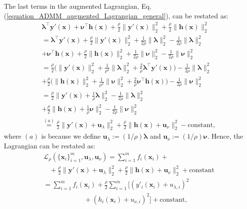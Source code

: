 \documentclass[lang=cn,10pt]{gorgeousnbook}
\numberwithin{equation}{section}%
\numberwithin{figure}{section}%
\begin{document}
The last terms in the augmented Lagrangian, Eq. (\ref{equation_ADMM_augmented_Lagrangian_general}), can be restated as:
\begin{align*}
&\boldsymbol{\lambda}^\top \boldsymbol{y}'(\boldsymbol{x}) + \boldsymbol{\nu}^\top \boldsymbol{h}(\boldsymbol{x}) + \frac{\rho}{2} \|\boldsymbol{y}'(\boldsymbol{x})\|_2^2 + \frac{\rho}{2} \|\boldsymbol{h}(\boldsymbol{x})\|_2^2 \\
&=\boldsymbol{\lambda}^\top \boldsymbol{y}'(\boldsymbol{x}) + \frac{\rho}{2} \|\boldsymbol{y}'(\boldsymbol{x})\|_2^2 + \frac{1}{2\rho} \|\boldsymbol{\lambda}\|_2^2 - \frac{1}{2\rho} \|\boldsymbol{\lambda}\|_2^2 \\
&+ \boldsymbol{\nu}^\top \boldsymbol{h}(\boldsymbol{x}) + \frac{\rho}{2} \|\boldsymbol{h}(\boldsymbol{x})\|_2^2 + \frac{1}{2\rho} \|\boldsymbol{\nu}\|_2^2 - \frac{1}{2\rho} \|\boldsymbol{\nu}\|_2^2 \\
&\!\!= \frac{\rho}{2} \Big(\|\boldsymbol{y}'(\boldsymbol{x})\|_2^2 + \frac{1}{\rho^2} \|\boldsymbol{\lambda}\|_2^2 + \frac{2}{\rho} \boldsymbol{\lambda}^\top \boldsymbol{y}'(\boldsymbol{x}) \Big) - \frac{1}{2\rho} \|\boldsymbol{\lambda}\|_2^2 \\
&+ \frac{\rho}{2} \Big(\|\boldsymbol{h}(\boldsymbol{x})\|_2^2 + \frac{1}{\rho^2} \|\boldsymbol{\nu}\|_2^2 + \frac{2}{\rho} \boldsymbol{\nu}^\top \boldsymbol{h}(\boldsymbol{x}) \Big) - \frac{1}{2\rho} \|\boldsymbol{\nu}\|_2^2 \\
&= \frac{\rho}{2} \big\|\boldsymbol{y}'(\boldsymbol{x}) + \frac{1}{\rho} \boldsymbol{\lambda}\big\|_2^2 - \frac{1}{2\rho} \|\boldsymbol{\lambda}\|_2^2 \\
&+ \frac{\rho}{2} \big\|\boldsymbol{h}(\boldsymbol{x}) + \frac{1}{\rho} \boldsymbol{\nu}\big\|_2^2 - \frac{1}{2\rho} \|\boldsymbol{\nu}\|_2^2 \\
&\overset{(a)}{=} \frac{\rho}{2} \big\|\boldsymbol{y}'(\boldsymbol{x}) + \boldsymbol{u}_\lambda\big\|_2^2 + \frac{\rho}{2} \big\|\boldsymbol{h}(\boldsymbol{x}) + \boldsymbol{u}_\nu\big\|_2^2 - \text{constant},
\end{align*}
where $(a)$ is because we define $\boldsymbol{u}_\lambda := (1/\rho) \boldsymbol{\lambda}$ and $\boldsymbol{u}_\nu := (1/\rho) \boldsymbol{\nu}$. 
Hence, the Lagrangian can be restated as:
\begin{align*}
&\mathcal{L}_\rho(\{\boldsymbol{x}_i\}_{i=1}^m, \boldsymbol{u}_\lambda, \boldsymbol{u}_\nu) = \sum_{i=1}^m f_i(\boldsymbol{x}_i) + \\
&~~~~+ \frac{\rho}{2} \big\|\boldsymbol{y}'(\boldsymbol{x}) + \boldsymbol{u}_\lambda\big\|_2^2 + \frac{\rho}{2} \big\|\boldsymbol{h}(\boldsymbol{x}) + \boldsymbol{u}_\nu\big\|_2^2 + \text{constant} \\
&= \sum_{i=1}^m f_i(\boldsymbol{x}_i) + \frac{\rho}{2} \sum_{i=1}^m \big[(y'_i(\boldsymbol{x}_i) + u_{\lambda,i})^2 \\
&~~~~~~~~~~~~~~~~~~~~~~~~~~~+ (h_i(\boldsymbol{x}_i) + u_{\nu,i})^2\big] + \text{constant},
\end{align*}
\end{document}
